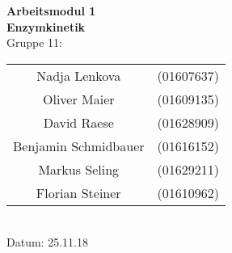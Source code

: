 \begin{titlepage}
  \begin{center}
    \phantom{hallo}
    \vspace{2cm}
    \Huge{\bfseries{Arbeitsmodul 1}}\\
    \vspace{1.5cm}
    \huge{\bfseries{Enzymkinetik}}\\
    \vspace{1.5cm}
    \huge{Gruppe 11}:\\
    \vspace{1cm}
    \begin{tabular}{cc}
      
      Nadja Lenkova & (01607637)\\
      Oliver Maier & (01609135)\\
      David Raese  & (01628909)\\
      Benjamin Schmidbauer & (01616152)\\
      Markus Seling & (01629211)\\
      Florian Steiner & (01610962)\\
    \end{tabular} \\
    \vspace{1cm}
    Datum: 25.11.18
  \end{center}
\end{titlepage}